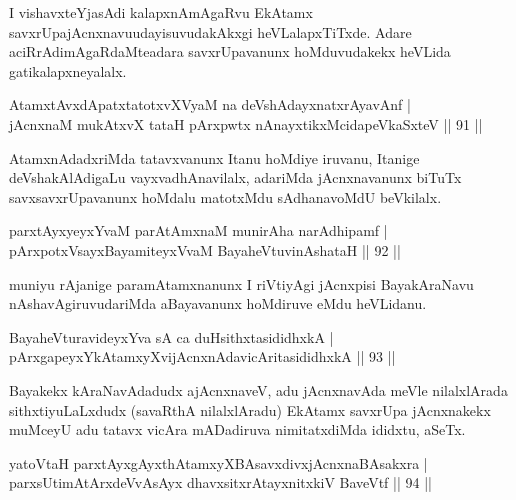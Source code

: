 \begin{artha}
I vishavxteYjasAdi kalapxnAmAgaRvu EkAtamx savxrUpajAcnxnavu\break udayisuvudakAkxgi heVLalapxTiTxde. Adare aciRrAdimAgaRdaMte\break adara savxrUpavanunx hoMduvudakekx heVLida gatikalapxneyalalx.
\end{artha}

\begin{shl}
AtamxtAvxdApatxtatotxvXV\s yaM na deVshAdayxnatxrAyavAnf |\\
jAcnxnaM mukAtxvX tataH pArxpwtx nAnayxtikxMcidapeVkaSxteV \hfill || 91 || 
\end{shl}

\begin{artha}
AtamxnAdadxriMda tatavxvanunx Itanu hoMdiye iruvanu, Itanige deVshakAlAdigaLu vayxvadhAnavilalx, adariMda jAcnxnavanunx biTuTx savxsavxrUpavanunx hoMdalu matotxMdu sAdhanavoMdU beVkilalx.
\end{artha}

\begin{shl}
parxtAyxyeyxYvaM parAtAmxnaM munirAha narAdhipamf |\\
pArxpotxV\s sayxBayamiteyxVvaM BayaheVtuvinAshataH \hfill || 92 || 
\end{shl}

\begin{artha}
muniyu rAjanige paramAtamxnanunx I riVtiyAgi jAcnxpisi BayakAraNavu nAshavAgiruvudariMda aBayavanunx hoMdiruve eMdu heVLidanu.
\end{artha}


\begin{shl}
BayaheVturavideyxYva sA ca duHsithxtasididhxkA |\\
pArxgapeyxYkAtamxyXvijAcnxnAdavicAritasididhxkA \hfill || 93 || 
\end{shl}

\begin{artha}
Bayakekx kAraNavAdadudx ajAcnxnaveV, adu jAcnxnavAda meVle nilalxlArada sithxtiyuLaLxdudx (savaRthA nilalxlAradu) EkAtamx savxrUpa jAcnxnakekx muMceyU adu tatavx vicAra mADadiruva nimitatxdiMda ididxtu, aSeTx.
\end{artha}

\begin{shl}
yatoV\s taH parxtAyxgAyxthAtamxyXBAsavxdivxjAcnxnaBAsakxra |\\
parxsUtimAtArxdeVvAsAyx dhavxsitxrAtayxnitxkiV BaveVtf \hfill || 94 || 
\end{shl}

